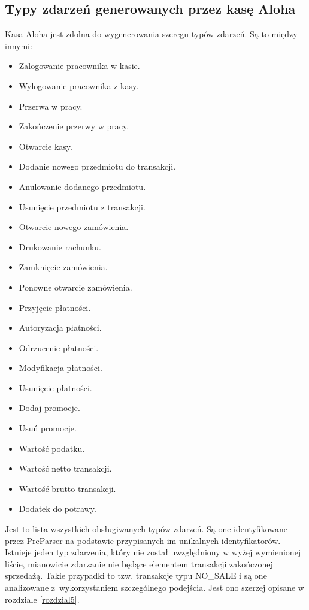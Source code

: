 \documentclass[a4paper]{book}
\begin{document}
\subsection{Typy zdarzeń generowanych przez kasę Aloha}
Kasa Aloha jest zdolna do wygenerowania szeregu typów zdarzeń. Są to między innymi:
\begin{itemize}
	\item Zalogowanie pracownika w kasie.
	\item Wylogowanie pracownika z kasy.
	\item Przerwa w pracy.
	\item Zakończenie przerwy w pracy.
	\item Otwarcie kasy.
	\item Dodanie nowego przedmiotu do transakcji.
	\item Anulowanie dodanego przedmiotu.
	\item Usunięcie przedmiotu z transakcji.
	\item Otwarcie nowego zamówienia.
	\item Drukowanie rachunku.
	\item Zamknięcie zamówienia.
	\item Ponowne otwarcie zamówienia.
	\item Przyjęcie płatności.
	\item Autoryzacja płatności.
	\item Odrzucenie płatności.
	\item Modyfikacja płatności.
	\item Usunięcie płatności.
	\item Dodaj promocje.
	\item Usuń promocje.
	\item Wartość podatku.
	\item Wartość netto transakcji.
	\item Wartość brutto transakcji.
	\item Dodatek do potrawy.
\end{itemize}
Jest to lista wszystkich obsługiwanych typów zdarzeń. Są one identyfikowane przez PreParser na podstawie przypisanych im unikalnych identyfikatorów. Istnieje  jeden typ zdarzenia, który nie został uwzględniony w wyżej wymienionej liście, mianowicie zdarzanie nie będące elementem transakcji zakończonej sprzedażą. Takie przypadki to tzw. transakcje typu NO\_SALE i są  one analizowane z~wykorzystaniem szczególnego podejścia. Jest ono szerzej opisane w rozdziale \ref{rozdzial5}.
\end{document}
